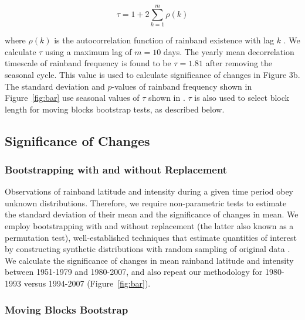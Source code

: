 \documentclass[9pt,twocolumn,twoside,lineno]{pnas-new}
\begin{document}
\begin{equation*}
\tau=1+2\sum_{k=1}^m \rho(k)
\end{equation*}

	where $\rho(k)$ is the autocorrelation function of rainband existence with lag $k$ \citep{VonStorch1999}. We calculate $\tau$ using a maximum lag of $m=10$ days. The yearly mean decorrelation timescale of rainband frequency is found to be $\tau = 1.81$ after removing the seasonal cycle. This value is used to calculate significance of changes in Figure 3b. The standard deviation and $p$-values of rainband frequency shown in Figure~\ref{fig:bar} use seasonal values of $\tau$ shown in \citet{Day2016}. $\tau$ is also used to select block length for moving blocks bootstrap tests, as described below.
 
\subsection{Significance of Changes}

\subsubsection{Bootstrapping with and without Replacement}

	Observations of rainband latitude and intensity during a given time period obey unknown distributions. Therefore, we require non-parametric tests to estimate the standard deviation of their mean and the significance of changes in mean. We employ bootstrapping with and without replacement (the latter also known as a permutation test), well-established techniques that estimate quantities of interest by constructing synthetic distributions with random sampling of original data \citep{Good2005}. We calculate the significance of changes in mean rainband latitude and intensity between 1951-1979 and 1980-2007, and also repeat our methodology for 1980-1993 versus 1994-2007 (Figure~\ref{fig:bar}).

\subsubsection{Moving Blocks Bootstrap}	
	
\end{document}
